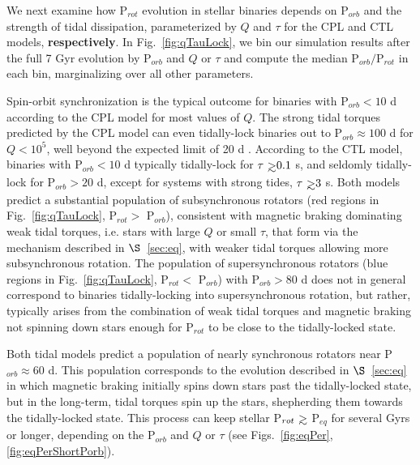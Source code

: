 \documentclass[twocolumn]{aastex61}
\def\gsim{~\rlap{$>$}{\lower 1.0ex\hbox{$\sim$}}}
\newcommand{\xxx}[1]{{\textbf{#1}}}
\begin{document}
We next examine how P$_{rot}$ evolution in stellar binaries depends on P$_{orb}$ and the strength of tidal dissipation, parameterized by $Q$ and $\tau$ for the CPL and CTL models, \xxx{respectively}. In Fig.~\ref{fig:qTauLock}, we bin our simulation results after the full 7 Gyr evolution by P$_{orb}$ and $Q$ or $\tau$ and compute the median P$_{orb}/$P$_{rot}$ in each bin, marginalizing over all other parameters.

Spin-orbit synchronization is the typical outcome for binaries with P$_{orb} < 10$ d according to the CPL model for most values of $Q$. The strong tidal torques predicted by the CPL model can even tidally-lock binaries out to P$_{orb} \approx 100 $ d for $Q < 10^5$, well beyond the expected limit of 20 d \citep{Meibom2006}.  According to the CTL model, binaries with P$_{orb} < 10$ d typically tidally-lock for $\tau \gsim 0.1$ s, and seldomly tidally-lock for P$_{orb} > 20$ d, except for systems with strong tides, $\tau \gsim 3$ s.  Both models predict a substantial population of subsynchronous rotators (red regions in Fig.~\ref{fig:qTauLock}, P$_{rot} >$ P$_{orb}$), consistent with magnetic braking dominating weak tidal torques, i.e. stars with large $Q$ or small $\tau$, that form via the mechanism described in $\S$~\ref{sec:eq}, with weaker tidal torques allowing more subsynchronous rotation.  The population of supersynchronous rotators (blue regions in Fig.~\ref{fig:qTauLock}, P$_{rot} <$ P$_{orb}$) with P$_{orb} > 80$ d does not in general correspond to binaries tidally-locking into supersynchronous rotation, but rather, typically arises from the combination of weak tidal torques and magnetic braking not spinning down stars enough for P$_{rot}$ to be close to the tidally-locked state.  

Both tidal models predict a population of nearly synchronous rotators near P$_{orb} \approx 60$ d.  This population corresponds to the evolution described in $\S$~\ref{sec:eq} in which magnetic braking initially spins down stars past the tidally-locked state, but in the long-term, tidal torques spin up the stars, shepherding them towards the tidally-locked state.  This process can keep stellar P$_{rot} \gsim$ P$_{eq}$ for several Gyrs or longer, depending on the P$_{orb}$ and $Q$ or $\tau$ (see Figs.~\ref{fig:eqPer},\ref{fig:eqPerShortPorb}). 
\end{document}
